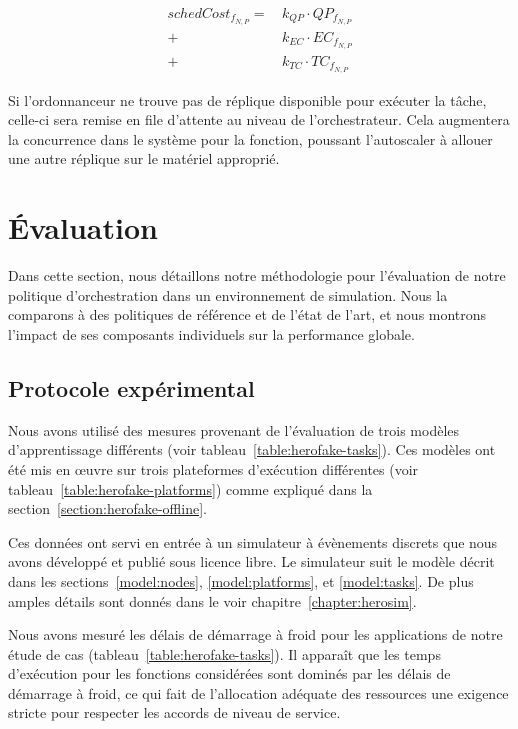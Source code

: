 \begin{equation}
\begin{split}
    schedCost_{{f}_{N, P}} = \, &k_{QP} \cdot QP_{{f}_{N, P}} \\
    + &k_{EC} \cdot {EC}_{{f}_{N, P}} \\
    + &k_{TC} \cdot TC_{{f}_{N, P}}
\end{split}
\label{eq:herofake-HRO-scheduling-cost-function}
\end{equation}

Si l'ordonnanceur ne trouve pas de réplique disponible pour exécuter la tâche, celle-ci sera remise en file d'attente au niveau de l'orchestrateur. Cela augmentera la concurrence dans le système pour la fonction, poussant l'autoscaler à allouer une autre réplique sur le matériel approprié.

\section{Évaluation}
\label{section:herofake-evaluation}

Dans cette section, nous détaillons notre méthodologie pour l'évaluation de notre politique d'orchestration dans un environnement de simulation. Nous la comparons à des politiques de référence et de l'état de l'art, et nous montrons l'impact de ses composants individuels sur la performance globale.

\subsection{Protocole expérimental}

Nous avons utilisé des mesures provenant de l'évaluation de trois modèles d'apprentissage différents (voir tableau~\ref{table:herofake-tasks}). Ces modèles ont été mis en œuvre sur trois plateformes d'exécution différentes (voir tableau~\ref{table:herofake-platforms}) comme expliqué dans la section~\ref{section:herofake-offline}.

Ces données ont servi en entrée à un simulateur à évènements discrets que nous avons développé et publié sous licence libre. Le simulateur suit le modèle décrit dans les sections~\ref{model:nodes}, \ref{model:platforms}, et \ref{model:tasks}. De plus amples détails sont donnés dans le voir chapitre~\ref{chapter:herosim}.

Nous avons mesuré les délais de démarrage à froid pour les applications de notre étude de cas (tableau~\ref{table:herofake-tasks}). Il apparaît que les temps d'exécution pour les fonctions considérées sont dominés par les délais de démarrage à froid, ce qui fait de l'allocation adéquate des ressources une exigence stricte pour respecter les accords de niveau de service.

